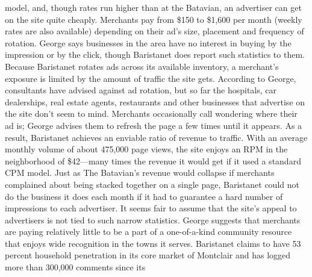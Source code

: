 model, and, though rates run higher than at the Batavian, an advertiser can get
on the site quite cheaply. Merchants pay from \$150 to \$1,600 per month (weekly
rates are also available) depending on their ad’s size, placement and frequency
of rotation. George says businesses in the area have no interest in buying by the
impression or by the click, though Baristanet does report such statistics to them.
Because Baristanet rotates ads across its available inventory, a merchant’s exposure
is limited by the amount of traffic the site gets. According to George, consultants
have advised against ad rotation, but so far the hospitals, car dealerships,
real estate agents, restaurants and other businesses that advertise on the site don’t
seem to mind. Merchants occasionally call wondering where their ad is; George
advises them to refresh the page a few times until it appears.
As a result, Baristanet achieves an enviable ratio of revenue to traffic. With an
average monthly volume of about 475,000 page views, the site enjoys an RPM
in the neighborhood of \$42—many times the revenue it would get if it used a
standard CPM model. Just as The Batavian’s revenue would collapse if merchants
complained about being stacked together on a single page, Baristanet could not
do the business it does each month if it had to guarantee a hard number of impressions
to each advertiser.
It seems fair to assume that the site’s appeal to advertisers is not tied to such
narrow statistics. George suggests that merchants are paying relatively little to be a
part of a one-of-a-kind community resource that enjoys wide recognition in the
towns it serves. Baristanet claims to have 53 percent household penetration in its
core market of Montclair and has logged more than 300,000 comments since its

